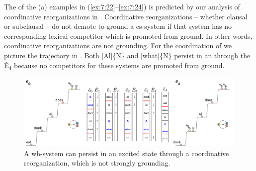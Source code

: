 \label{ex:7:22}
    \label{ex:7:22a}
    \label{ex:7:22b}
    \label{ex:7:22c}
\z
\z

\label{ex:7:23}
    \label{ex:7:23a}
    \label{ex:7:23b}
    \label{ex:7:23c}
\z
\z

\label{ex:7:24}
    \label{ex:7:24a}
    \label{ex:7:24b}
    \label{ex:7:24c}
\z
\z

The  of the (a) examples in (\ref{ex:7:22}--\ref{ex:7:24}) is predicted by our analysis of coordinative reorganizations in . Coordinative reorganizations -- whether clausal or subclausal -- do not demote to ground a cs-system if that system has no corresponding lexical competitor which is promoted from ground. In other words, coordinative reorganizations are not grounding. For the  coordination of  we picture the trajectory in {}. Both [Al]\{N\} and [what]\{N\} persist in an  through the  Ê\textsubscript{4} because no competitors for these systems are promoted from ground.

  
\begin{figure}
\includegraphics[width=\textwidth]{figures/Tilsen-img165.png}
\caption{A wh-system can persist in an excited state through a coordinative reorganization, which is not strongly grounding.}
\label{fig:7:21}
\end{figure}
 

